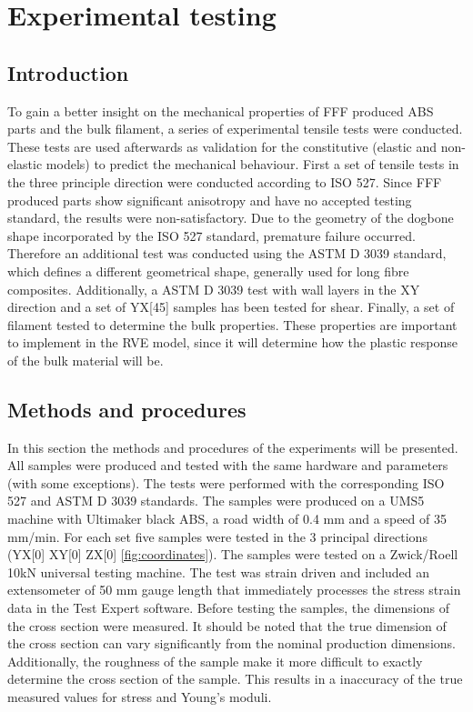 \chapter{Experimental testing}
\label{chp:5}

\graphicspath{{chapter_5_Experimentaltesting/figures}}

\section{Introduction}
To gain a better insight on the mechanical properties of FFF produced ABS parts and the bulk filament, a series of experimental tensile tests were conducted. These tests are used afterwards as validation for the constitutive (elastic and non-elastic models) to predict the mechanical behaviour. First a set of tensile tests in the three principle direction were conducted according to ISO 527\cite{ISO2013NEN-EN-ISO527-4}\cite{NEN-EN-ISO2016NEN-EN-ISO527-2}. Since FFF produced parts show significant anisotropy and have no accepted testing standard, the results were non-satisfactory. Due to the geometry of the dogbone shape incorporated by the ISO 527 standard, premature failure occurred. Therefore an additional test was conducted using the ASTM D 3039 \cite{ASTM2008ASTM3039} standard, which defines a different geometrical shape, generally used for long fibre composites. Additionally, a ASTM D 3039 test with wall layers in the XY direction and a set of YX[45] samples has been tested for shear. Finally, a set of filament tested to determine the bulk properties. These properties are important to implement in the RVE model, since it will determine how the plastic response of the bulk material will be. 

\section{Methods and procedures}
In this section the methods and procedures of the experiments will be presented. All samples were produced and tested with the same hardware and parameters (with some exceptions). The tests were performed with the corresponding ISO 527 and ASTM D 3039 standards.
The samples were produced on a UMS5 machine with Ultimaker black ABS\cite{Ultimaker2018TechnicalABS}, a road width of 0.4 mm and a speed of 35 mm/min. For each set five samples were tested in the 3 principal directions (YX[0] XY[0] ZX[0] \ref{fig:coordinates}). The samples were tested on a Zwick/Roell 10kN universal testing machine. The test was strain driven and included an extensometer of 50 mm gauge length that immediately processes the stress strain data in the Test Expert software. Before testing the samples, the dimensions of the cross section were measured. It should be noted that the true dimension of the cross section can vary significantly from the nominal production dimensions. Additionally, the roughness of the sample make it more difficult to exactly determine the cross section of the sample. This results in a inaccuracy of the true measured values for stress and Young's moduli. 

